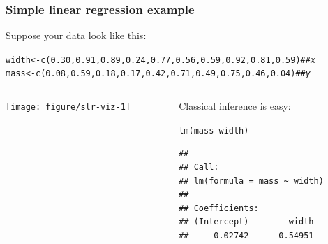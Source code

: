 \documentclass[color=usenames,dvipsnames]{beamer}\usepackage[]{graphicx}\usepackage[]{xcolor}
\makeatletter
\newcommand{\hlnum}[1]{\textcolor[rgb]{0.69,0.494,0}{#1}}%
\newcommand{\hlcom}[1]{\textcolor[rgb]{0.514,0.506,0.514}{\textit{#1}}}%
\newcommand{\hlopt}[1]{\textcolor[rgb]{0,0,0}{#1}}%
\newcommand{\hldef}[1]{\textcolor[rgb]{0,0,0}{#1}}%
\newcommand{\hlkwb}[1]{\textcolor[rgb]{0,0.341,0.682}{#1}}%
\newcommand{\hlkwd}[1]{\textcolor[rgb]{0.004,0.004,0.506}{#1}}%
\newenvironment{kframe}{%
 \def\at@end@of@kframe{}%
 \ifinner\ifhmode%
  \def\at@end@of@kframe{\end{minipage}}%
  \begin{minipage}{\columnwidth}%
 \fi\fi%
 \def\FrameCommand##1{\hskip\@totalleftmargin \hskip-\fboxsep
 \colorbox{shadecolor}{##1}\hskip-\fboxsep
     \hskip-\linewidth \hskip-\@totalleftmargin \hskip\columnwidth}%
 \MakeFramed {\advance\hsize-\width
   \@totalleftmargin\z@ \linewidth\hsize
   \@setminipage}}%
 {\par\unskip\endMakeFramed%
 \at@end@of@kframe}
\newenvironment{knitrout}{}{} %
\makeatother
\begin{document}
\begin{frame}[fragile]
  \frametitle{Simple linear regression example}
  Suppose your data look like this:
\begin{knitrout}\tiny
{}\color{fgcolor}\begin{kframe}
\begin{alltt}
\hldef{width} \hlkwb{<-} \hlkwd{c}\hldef{(}\hlnum{0.30}\hldef{,} \hlnum{0.91}\hldef{,} \hlnum{0.89}\hldef{,} \hlnum{0.24}\hldef{,} \hlnum{0.77}\hldef{,} \hlnum{0.56}\hldef{,} \hlnum{0.59}\hldef{,} \hlnum{0.92}\hldef{,} \hlnum{0.81}\hldef{,} \hlnum{0.59}\hldef{)}  \hlcom{## x}
\hldef{mass} \hlkwb{<-} \hlkwd{c}\hldef{(}\hlnum{0.08}\hldef{,} \hlnum{0.59}\hldef{,} \hlnum{0.18}\hldef{,} \hlnum{0.17}\hldef{,} \hlnum{0.42}\hldef{,} \hlnum{0.71}\hldef{,} \hlnum{0.49}\hldef{,} \hlnum{0.75}\hldef{,} \hlnum{0.46}\hldef{,} \hlnum{0.04}\hldef{)}   \hlcom{## y}
\end{alltt}
\end{kframe}
\end{knitrout}
\begin{columns}
  \begin{column}{0.5\textwidth}
\begin{knitrout}
\color{fgcolor}
\texttt{[image: figure/slr-viz-1]} 
\end{knitrout}
  \end{column}
  \pause
  \begin{column}{0.5\textwidth}
    Classical inference is easy:
\begin{knitrout}\scriptsize
{}\color{fgcolor}\begin{kframe}
\begin{alltt}
\hlkwd{lm}\hldef{(mass}\hlopt{~}\hldef{width)}
\end{alltt}
\begin{verbatim}
## 
## Call:
## lm(formula = mass ~ width)
## 
## Coefficients:
## (Intercept)        width  
##     0.02742      0.54951
\end{verbatim}
\end{kframe}
\end{knitrout}
  \end{column}
\end{columns}
\end{frame}
\end{document}
